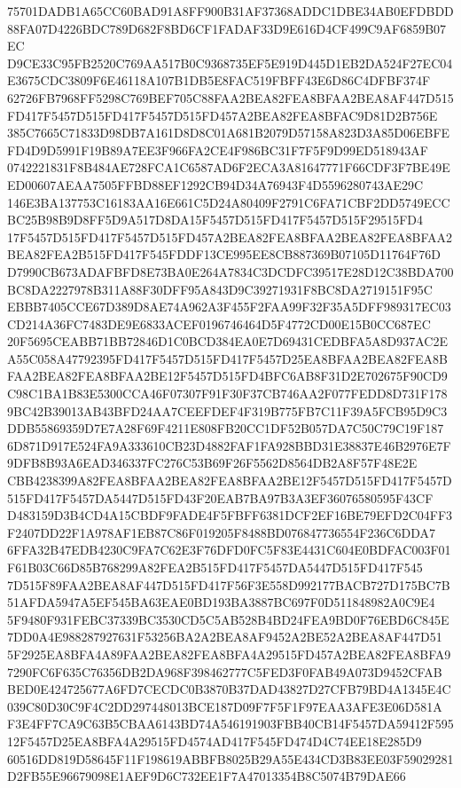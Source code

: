 \documentclass[UTF8,fontset=fandol,zihao=-4,a4paper]{ctexart}
\begin{document}
{{75701DADB1A65CC60BAD91A8FF900B31AF37368ADDC1DBE34AB0EFDBDD88FA07D4226BDC789D682F8BD6CF1FADAF33D9E616D4CF499C9AF6859B07EC
D9CE33C95FB2520C769AA517B0C9368735EF5E919D445D1EB2DA524F27EC04E3675CDC3809F6E46118A107B1DB5E8FAC519FBFF43E6D86C4DFBF374F
62726FB7968FF5298C769BEF705C88FAA2BEA82FEA8BFAA2BEA8AF447D515FD417F5457D515FD417F5457D515FD457A2BEA82FEA8BFAC9D81D2B756E
385C7665C71833D98DB7A161D8D8C01A681B2079D57158A823D3A85D06EBFEFD4D9D5991F19B89A7EE3F966FA2CE4F986BC31F7F5F9D99ED518943AF
0742221831F8B484AE728FCA1C6587AD6F2ECA3A81647771F66CDF3F7BE49EED00607AEAA7505FFBD88EF1292CB94D34A76943F4D5596280743AE29C
146E3BA137753C16183AA16E661C5D24A80409F2791C6FA71CBF2DD5749ECCBC25B98B9D8FF5D9A517D8DA15F5457D515FD417F5457D515F29515FD4
17F5457D515FD417F5457D515FD457A2BEA82FEA8BFAA2BEA82FEA8BFAA2BEA82FEA2B515FD417F545FDDF13CE995EE8CB887369B07105D11764F76D
D7990CB673ADAFBFD8E73BA0E264A7834C3DCDFC39517E28D12C38BDA700BC8DA2227978B311A88F30DFF95A843D9C39271931F8BC8DA2719151F95C
EBBB7405CCE67D389D8AE74A962A3F455F2FAA99F32F35A5DFF989317EC03CD214A36FC7483DE9E6833ACEF0196746464D5F4772CD00E15B0CC687EC
20F5695CEABB71BB72846D1C0BCD384EA0E7D69431CEDBFA5A8D937AC2EA55C058A47792395FD417F5457D515FD417F5457D25EA8BFAA2BEA82FEA8B
FAA2BEA82FEA8BFAA2BE12F5457D515FD4BFC6AB8F31D2E702675F90CD9C98C1BA1B83E5300CCA46F07307F91F30F37CB746AA2F077FEDD8D731F178
9BC42B39013AB43BFD24AA7CEEFDEF4F319B775FB7C11F39A5FCB95D9C3DDB55869359D7E7A28F69F4211E808FB20CC1DF52B057DA7C50C79C19F187
6D871D917E524FA9A333610CB23D4882FAF1FA928BBD31E38837E46B2976E7F9DFB8B93A6EAD346337FC276C53B69F26F5562D8564DB2A8F57F48E2E
CBB4238399A82FEA8BFAA2BEA82FEA8BFAA2BE12F5457D515FD417F5457D515FD417F5457DA5447D515FD43F20EAB7BA97B3A3EF36076580595F43CF
D483159D3B4CD4A15CBDF9FADE4F5FBFF6381DCF2EF16BE79EFD2C04FF3F2407DD22F1A978AF1EB87C86F019205F8488BD076847736554F236C6DDA7
6FFA32B47EDB4230C9FA7C62E3F76DFD0FC5F83E4431C604E0BDFAC003F01F61B03C66D85B768299A82FEA2B515FD417F5457DA5447D515FD417F545
7D515F89FAA2BEA8AF447D515FD417F56F3E558D992177BACB727D175BC7B51AFDA5947A5EF545BA63EAE0BD193BA3887BC697F0D511848982A0C9E4
5F9480F931FEBC37339BC3530CD5C5AB528B4BD24FEA9BD0F76EBD6C845E7DD0A4E988287927631F53256BA2A2BEA8AF9452A2BE52A2BEA8AF447D51
5F2925EA8BFA4A89FAA2BEA82FEA8BFA4A29515FD457A2BEA82FEA8BFA97290FC6F635C76356DB2DA968F398462777C5FED3F0FAB49A073D9452CFAB
BED0E424725677A6FD7CECDC0B3870B37DAD43827D27CFB79BD4A1345E4C039C80D30C9F4C2DD297448013BCE187D09F7F5F1F97EAA3AFE3E06D581A
F3E4FF7CA9C63B5CBAA6143BD74A546191903FBB40CB14F5457DA59412F59512F5457D25EA8BFA4A29515FD4574AD417F545FD474D4C74EE18E285D9
60516DD819D58645F11F198619ABBFB8025B29A55E434CD3B83EE03F59029281D2FB55E96679098E1AEF9D6C732EE1F7A47013354B8C5074B79DAE66
}}
\end{document}
